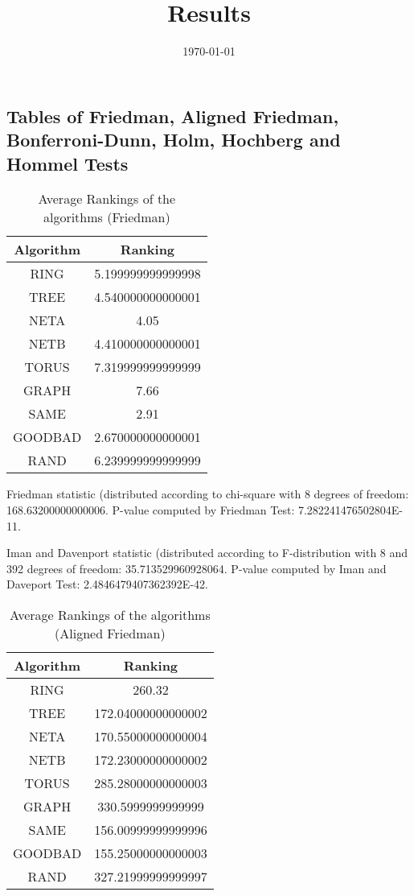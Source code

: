 \documentclass[a4paper,10pt]{article}
\title{Results}
\author{}
\date{\today}
\begin{document}
\begin{landscape}
\oddsidemargin 0in \topmargin 0in\maketitle
\section{Tables of Friedman, Aligned Friedman, Bonferroni-Dunn, Holm, Hochberg and Hommel Tests}
\begin{table}[!htp]
\centering
\caption{Average Rankings of the algorithms (Friedman)
}\begin{tabular}{c|c}
Algorithm&Ranking\\
\hline
 RING&5.199999999999998\\
 TREE&4.540000000000001\\
 NETA&4.05\\
 NETB&4.410000000000001\\
 TORUS&7.319999999999999\\
 GRAPH&7.66\\
 SAME&2.91\\
 GOODBAD&2.670000000000001\\
 RAND&6.239999999999999\\
\end{tabular}
\end{table}


Friedman statistic (distributed according to chi-square with 8 degrees of freedom: 168.63200000000006. 
P-value computed by Friedman Test: 7.282241476502804E-11.\newline

Iman and Davenport statistic (distributed according to F-distribution with 8 and 392 degrees of freedom: 35.713529960928064. 
P-value computed by Iman and Daveport Test: 2.4846479407362392E-42.\newline


\newpage

\begin{table}[!htp]
\centering
\caption{Average Rankings of the algorithms (Aligned Friedman)
}\begin{tabular}{c|c}
Algorithm&Ranking\\
\hline
 RING&260.32\\
 TREE&172.04000000000002\\
 NETA&170.55000000000004\\
 NETB&172.23000000000002\\
 TORUS&285.28000000000003\\
 GRAPH&330.5999999999999\\
 SAME&156.00999999999996\\
 GOODBAD&155.25000000000003\\
 RAND&327.21999999999997\\
\end{tabular}
\end{table}



\end{landscape}
\end{document}
